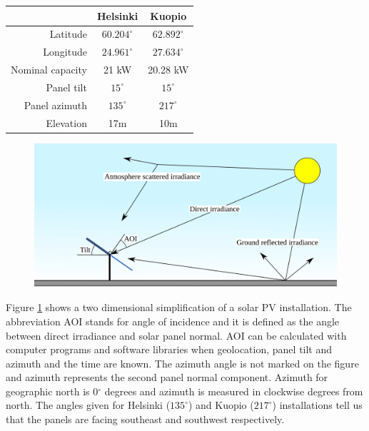 \begin{table}[H]
\centering
\begin{tabular}{r|cc} \hline\hline

 & Helsinki & Kuopio\\ \hline
 Latitude & $60.204^\circ$ & $62.892^\circ$ \\
 Longitude & $24.961^\circ$  &  $27.634^\circ$\\
 Nominal capacity &21 kW & 20.28 kW \\
 Panel tilt & $15^\circ$ & $15^\circ$ \\
 Panel azimuth & $135^\circ$ & $217^\circ$ \\
 Elevation & 17m & 10m\\
\hline\hline
\end{tabular}
\label{table_fmi_helsinki_kuopio_parameters}
\end{table}


\begin{figure}[h]
\centering
\includegraphics[width=0.8\linewidth]{pics/irradiancetypes}
\label{fig_simplediagram}
\end{figure}

\noindent
Figure \ref{fig_simplediagram} shows a two dimensional simplification of a solar PV installation. The abbreviation AOI stands for angle of incidence and it is defined as the angle between direct irradiance and solar panel normal. AOI can be calculated with computer programs and software libraries when geolocation, panel tilt and azimuth and the time are known. The azimuth angle is not marked on the figure and azimuth represents the second panel normal component. Azimuth for geographic north is 0$^\circ$ degrees and azimuth is measured in clockwise degrees from north. The angles given for Helsinki ($135^\circ$) and Kuopio ($217^\circ$) installations tell us that the panels are facing southeast and southwest respectively. 



